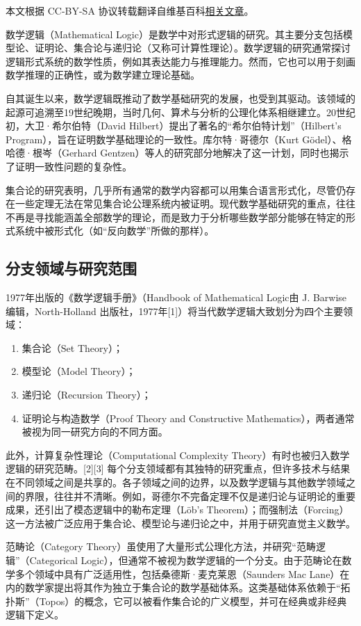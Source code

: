 
本文根据 CC-BY-SA 协议转载翻译自维基百科\href{https://en.wikipedia.org/wiki/Mathematical_logic}{相关文章}。

数学逻辑（Mathematical Logic）是数学中对形式逻辑的研究。其主要分支包括模型论、证明论、集合论与递归论（又称可计算性理论）。数学逻辑的研究通常探讨逻辑形式系统的数学性质，例如其表达能力与推理能力。然而，它也可以用于刻画数学推理的正确性，或为数学建立理论基础。

自其诞生以来，数学逻辑既推动了数学基础研究的发展，也受到其驱动。该领域的起源可追溯至19世纪晚期，当时几何、算术与分析的公理化体系相继建立。20世纪初，大卫·希尔伯特（David Hilbert）提出了著名的“希尔伯特计划”（Hilbert’s Program），旨在证明数学基础理论的一致性。库尔特·哥德尔（Kurt Gödel）、格哈德·根岑（Gerhard Gentzen）等人的研究部分地解决了这一计划，同时也揭示了证明一致性问题的复杂性。

集合论的研究表明，几乎所有通常的数学内容都可以用集合语言形式化，尽管仍存在一些定理无法在常见集合论公理系统内被证明。现代数学基础研究的重点，往往不再是寻找能涵盖全部数学的理论，而是致力于分析哪些数学部分能够在特定的形式系统中被形式化（如“反向数学”所做的那样）。
\subsection{分支领域与研究范围}
1977年出版的《数学逻辑手册》（Handbook of Mathematical Logic由 J. Barwise 编辑，North-Holland 出版社，1977年[1]）将当代数学逻辑大致划分为四个主要领域：
\begin{enumerate}
  \item 集合论（Set Theory）；
  \item 模型论（Model Theory）；
  \item 递归论（Recursion Theory）；
  \item 证明论与构造数学（Proof Theory and Constructive Mathematics），两者通常被视为同一研究方向的不同方面。
\end{enumerate}
此外，计算复杂性理论（Computational Complexity Theory）有时也被归入数学逻辑的研究范畴。[2][3]
每个分支领域都有其独特的研究重点，但许多技术与结果在不同领域之间是共享的。各子领域之间的边界，以及数学逻辑与其他数学领域之间的界限，往往并不清晰。例如，哥德尔不完备定理不仅是递归论与证明论的重要成果，还引出了模态逻辑中的勒布定理（Löb's Theorem）；而强制法（Forcing）这一方法被广泛应用于集合论、模型论与递归论之中，并用于研究直觉主义数学。

范畴论（Category Theory）虽使用了大量形式公理化方法，并研究“范畴逻辑”（Categorical Logic），但通常不被视为数学逻辑的一个分支。由于范畴论在数学多个领域中具有广泛适用性，包括桑德斯·麦克莱恩（Saunders Mac Lane）在内的数学家提出将其作为独立于集合论的数学基础体系。这类基础体系依赖于“拓扑斯”（Topos）的概念，它可以被看作集合论的广义模型，并可在经典或非经典逻辑下定义。
